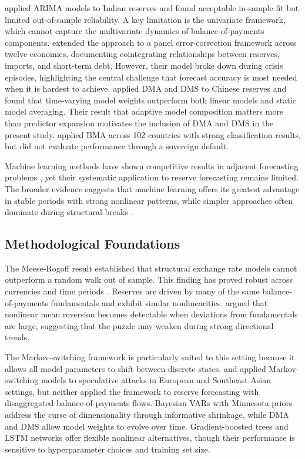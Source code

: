 \documentclass[12pt,a4paper]{article}
\begin{document}
\cite{SehgalSharma2008} applied ARIMA models to Indian reserves and found acceptable in-sample fit but limited out-of-sample reliability. A key limitation is the univariate framework, which cannot capture the multivariate dynamics of balance-of-payments components. \cite{Gosselin2005} extended the approach to a panel error-correction framework across twelve economies, documenting cointegrating relationships between reserves, imports, and short-term debt. However, their model broke down during crisis episodes, highlighting the central challenge that forecast accuracy is most needed when it is hardest to achieve. \cite{Gupta2014} applied DMA and DMS to Chinese reserves and found that time-varying model weights outperform both linear models and static model averaging. Their result that adaptive model composition matters more than predictor expansion motivates the inclusion of DMA and DMS in the present study. \cite{Salas2025} applied BMA across 102 countries with strong classification results, but did not evaluate performance through a sovereign default.

Machine learning methods have shown competitive results in adjacent forecasting problems \citep{MedeirosVasconcelosVeigaZilberman2021,RichardsonMulderVehbi2021}, yet their systematic application to reserve forecasting remains limited. The broader evidence suggests that machine learning offers its greatest advantage in stable periods with strong nonlinear patterns, while simpler approaches often dominate during structural breaks \citep{RichardsonMulderVehbi2021}.

\subsection{Methodological Foundations}

The Meese-Rogoff result \citep{MeeseRogoff1983} established that structural exchange rate models cannot outperform a random walk out of sample. This finding has proved robust across currencies and time periods \citep{Rossi2013,CheungChinnPascual2005}. Reserves are driven by many of the same balance-of-payments fundamentals and exhibit similar nonlinearities. \cite{TaylorPeelSarno2001} argued that nonlinear mean reversion becomes detectable when deviations from fundamentals are large, suggesting that the puzzle may weaken during strong directional trends.

The Markov-switching framework \citep{Hamilton1989,Krolzig1997} is particularly suited to this setting because it allows all model parameters to shift between discrete states. \cite{Peria2002} and \cite{BrunettiMarianoScottiTan2007} applied Markov-switching models to speculative attacks in European and Southeast Asian settings, but neither applied the framework to reserve forecasting with disaggregated balance-of-payments flows. Bayesian VARs with Minnesota priors \citep{Litterman1986,Banbura2010} address the curse of dimensionality through informative shrinkage, while DMA and DMS \citep{Raftery2010,KoopKorobilis2012} allow model weights to evolve over time. Gradient-boosted trees \citep{ChenGuestrin2016} and LSTM networks \citep{HochreiterSchmidhuber1997} offer flexible nonlinear alternatives, though their performance is sensitive to hyperparameter choices and training set size.
\end{document}

